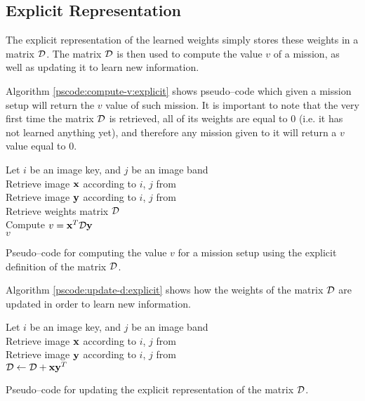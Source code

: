 \subsection{Explicit Representation} \label{subsect:meth:explicit}

The explicit representation of the learned weights simply stores these weights in a matrix $\mathcal{D}$. The matrix $\mathcal{D}$ is then used to compute the value $v$ of a mission, as well as updating it to learn new information.

Algorithm \ref{pscode:compute-v:explicit} shows pseudo--code which given a mission setup will return the $v$ value of such mission. It is important to note that the very first time the matrix $\mathcal{D}$ is retrieved, all of its weights are equal to $0$ (i.e. it has not learned anything yet), and therefore any mission given to it will return a $v$ value equal to $0$.

\vspace{0.4cm}
\begin{algorithm}[H]
    \SetAlgoLined
         {
            Let $i$ be an image key, and $j$ be an image band \\
            Retrieve image $\boldsymbol{\mathbf{x}}$ according to $i$, $j$ from \usno \\
            Retrieve image $\boldsymbol{\mathbf{y}}$ according to $i$, $j$ from \panstarrs \\
            Retrieve weights matrix $\mathcal{D}$ \\
            Compute $v = \boldsymbol{\mathbf{x}}^T \mathcal{D} \boldsymbol{\mathbf{y}}$ \\
            \Return $v$
        }
    \caption{Pseudo--code for computing the value $v$ for a mission setup using the explicit definition of the matrix $\mathcal{D}$.}
    \label{pscode:compute-v:explicit}
\end{algorithm}
\vspace{0.4cm}

Algorithm \ref{pscode:update-d:explicit} shows how the weights of the matrix $\mathcal{D}$ are updated in order to learn new information.

\vspace{0.4cm}
\begin{algorithm}[H]
    \SetAlgoLined
         {
            Let $i$ be an image key, and $j$ be an image band \\
            Retrieve image $\boldsymbol{\mathbf{x}}$ according to $i$, $j$ from \usno \\
            Retrieve image $\boldsymbol{\mathbf{y}}$ according to $i$, $j$ from \panstarrs \\
            $\mathcal{D} \gets \mathcal{D} + \boldsymbol{\mathbf{x}}\boldsymbol{\mathbf{y}}^T$ \\
        }
    \caption{Pseudo--code for updating the explicit representation of the matrix $\mathcal{D}$.}
    \label{pscode:update-d:explicit}
\end{algorithm}
\vspace{0.4cm}

